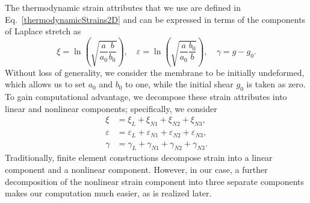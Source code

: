 The thermodynamic strain attributes that we use are defined in Eq.~\ref{thermodynamicStrains2D} and can be expressed in terms of the components of Laplace stretch as
\begin{equation}
    \xi = \ln\left( \sqrt{\frac{a}{a_0} \frac{b}{b_0}} \right) ,
    \quad
    \varepsilon = \ln\left(\sqrt{\frac{a}{a_0} \frac{b_0}{b}} \right) ,
    \quad 
    \gamma = g - g_0.
    \label{strainAttributesPentagon}
\end{equation}
Without loss of generality, we consider the membrane to be initially undeformed, which allows us to set $a_0$ and $b_0$ to one, while the initial shear $g_0$ is taken as zero.  To gain computational advantage, we decompose these strain attributes into linear and nonlinear components; specifically, we consider
\begin{subequations}
    \label{totalVirtualStrain}
    \begin{align}
    \xi & = \xi_{L} + \xi_{N1} + \xi_{N2} + \xi_{N3} , \\
    \varepsilon & = \varepsilon_{L} + \varepsilon_{N1} + \varepsilon_{N2} + \varepsilon_{N3} , \\
    \gamma & = \gamma_{L} + \gamma_{N1} + \gamma_{N2} + \gamma_{N3}.
    \end{align}
\end{subequations}
Traditionally, finite element constructions decompose strain into a linear component and a non\-linear component.  However, in our case, a further decomposition of the non\-linear strain component into three separate components makes our computation much easier, as is realized later. 

